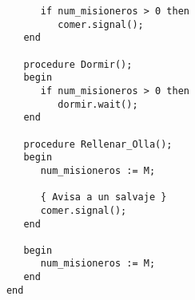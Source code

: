 \begin{ejercicio}
\begin{figure}[H]
\begin{verbatim}
                  if num_misioneros > 0 then
                     comer.signal();
               end

               procedure Dormir();
               begin
                  if num_misioneros > 0 then
                     dormir.wait();
               end

               procedure Rellenar_Olla();
               begin
                  num_misioneros := M;

                  { Avisa a un salvaje }
                  comer.signal();
               end

               begin
                  num_misioneros := M;
               end
            end
        \end{verbatim}
    \end{figure}
\end{ejercicio}

